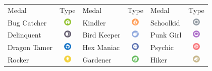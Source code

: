 \begin{table}[t]
\centering
\begin{tabular}{lc|lc|lc}
  Medal & Type & Medal & Type & Medal & Type\\
  \Midrule
  Bug Catcher & \includegraphics[width=1em,keepaspectratio]{images/bug.png} &
   Kindler & \includegraphics[width=1em,keepaspectratio]{images/fire.png} &
   Schoolkid &\includegraphics[width=1em,keepaspectratio]{images/normal.png} \\
  Delinquent & \includegraphics[width=1em,keepaspectratio]{images/dark.png} &
   Bird Keeper & \includegraphics[width=1em,keepaspectratio]{images/flying.png} &
   Punk Girl & \includegraphics[width=1em,keepaspectratio]{images/poison.png} \\
  Dragon Tamer & \includegraphics[width=1em,keepaspectratio]{images/dragon.png} &
   Hex Maniac &\includegraphics[width=1em,keepaspectratio]{images/ghost.png} &
   Psychic &\includegraphics[width=1em,keepaspectratio]{images/psychic.png} \\
  Rocker & \includegraphics[width=1em,keepaspectratio]{images/electric.png} &
   Gardener &\includegraphics[width=1em,keepaspectratio]{images/grass.png} &
   Hiker &\includegraphics[width=1em,keepaspectratio]{images/rock.png} \\

\end{tabular}
\end{table}
